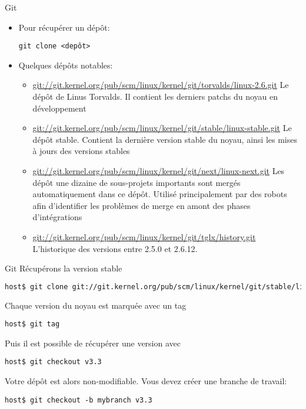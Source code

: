 \begin{frame}[fragile=singleslide]{Git}
  \begin{itemize} 
  \item Pour récupérer un dépôt:
    \begin{lstlisting}
git clone <depôt>
    \end{lstlisting} 
  \item Quelques dépôts notables:
    \begin{itemize} 
    \item
      \url{git://git.kernel.org/pub/scm/linux/kernel/git/torvalds/linux-2.6.git}
      Le dépôt de  Linus Torvalds. Il contient les  derniers patchs du
      noyau en développement
    \item
      \url{git://git.kernel.org/pub/scm/linux/kernel/git/stable/linux-stable.git}
      Le dépôt  stable. Contient la dernière version  stable du noyau,
      ainsi les mises à jours des versions stables
    \item
      \url{git://git.kernel.org/pub/scm/linux/kernel/git/next/linux-next.git}
      Les  dépôt une  dizaine de  sous-projets importants  sont mergés
      automatiquement dans  ce dépôt.  Utilisé  principalement par des
      robots  afin d'identifier les  problèmes de  merge en  amont des
      phases d'intégrations
    \item
      \url{git://git.kernel.org/pub/scm/linux/kernel/git/tglx/history.git}
      L'historique des versions entre 2.5.0 et 2.6.12.
    \end{itemize} 
  \end{itemize}
\end{frame}

\begin{frame}[fragile=singleslide]{Git}
  Récupérons la version stable
  \begin{lstlisting}[language=sh]
host$ git clone git://git.kernel.org/pub/scm/linux/kernel/git/stable/linux-stable.git
  \end{lstlisting} 
  Chaque version du noyau est marquée avec un tag
  \begin{lstlisting} 
host$ git tag
  \end{lstlisting} 
  Puis il est possible de récupérer une version avec
  \begin{lstlisting}
host$ git checkout v3.3
  \end{lstlisting}
  Votre dépôt est alors  non-modifiable.  Vous devez créer une branche
  de travail:
  \begin{lstlisting}
host$ git checkout -b mybranch v3.3
  \end{lstlisting}
\end{frame}

